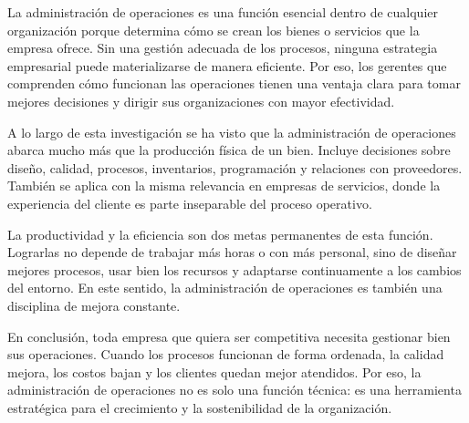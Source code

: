 La administración de operaciones es una función esencial dentro de cualquier organización porque determina cómo se crean los bienes o servicios que la empresa ofrece. Sin una gestión adecuada de los procesos, ninguna estrategia empresarial puede materializarse de manera eficiente. Por eso, los gerentes que comprenden cómo funcionan las operaciones tienen una ventaja clara para tomar mejores decisiones y dirigir sus organizaciones con mayor efectividad.

A lo largo de esta investigación se ha visto que la administración de operaciones abarca mucho más que la producción física de un bien. Incluye decisiones sobre diseño, calidad, procesos, inventarios, programación y relaciones con proveedores. También se aplica con la misma relevancia en empresas de servicios, donde la experiencia del cliente es parte inseparable del proceso operativo.

La productividad y la eficiencia son dos metas permanentes de esta función. Lograrlas no depende de trabajar más horas o con más personal, sino de diseñar mejores procesos, usar bien los recursos y adaptarse continuamente a los cambios del entorno. En este sentido, la administración de operaciones es también una disciplina de mejora constante.

En conclusión, toda empresa que quiera ser competitiva necesita gestionar bien sus operaciones. Cuando los procesos funcionan de forma ordenada, la calidad mejora, los costos bajan y los clientes quedan mejor atendidos. Por eso, la administración de operaciones no es solo una función técnica: es una herramienta estratégica para el crecimiento y la sostenibilidad de la organización.
